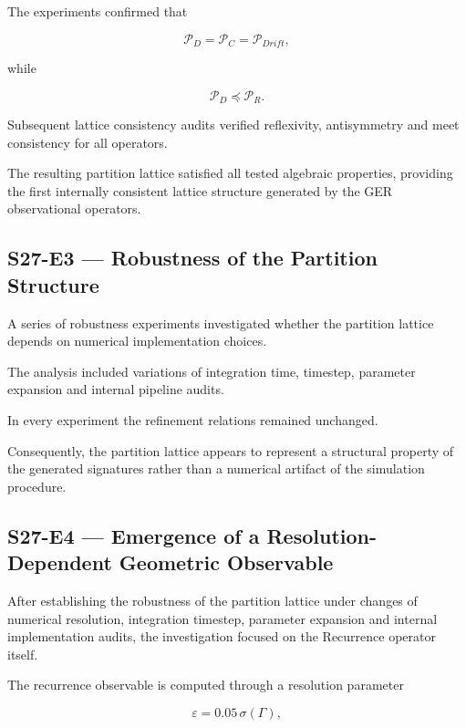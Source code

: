 The experiments confirmed that

\[
\mathcal P_D
=
\mathcal P_C
=
\mathcal P_{Drift},
\]

while

\[
\mathcal P_D
\preceq
\mathcal P_R.
\]

Subsequent lattice consistency audits verified reflexivity, antisymmetry and meet consistency for all operators.

The resulting partition lattice satisfied all tested algebraic properties, providing the first internally consistent lattice structure generated by the GER observational operators.


\subsection{S27-E3 --- Robustness of the Partition Structure}

A series of robustness experiments investigated whether the partition lattice depends on numerical implementation choices.

The analysis included variations of integration time, timestep, parameter expansion and internal pipeline audits.

In every experiment the refinement relations remained unchanged.

Consequently, the partition lattice appears to represent a structural property of the generated signatures rather than a numerical artifact of the simulation procedure.



\subsection{S27-E4 --- Emergence of a Resolution-Dependent Geometric Observable}

After establishing the robustness of the partition lattice under changes of numerical resolution, integration timestep, parameter expansion and internal implementation audits, the investigation focused on the Recurrence operator itself.

The recurrence observable is computed through a resolution parameter

\[
\varepsilon
=
0.05\,\sigma(\Gamma),
\]

